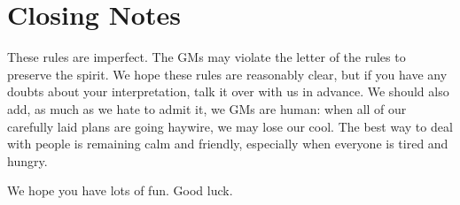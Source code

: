 \documentclass[sheet]{GL2020}
\begin{document}
\section{Closing Notes}

These rules are imperfect.  The GMs may violate the letter of the rules to preserve the spirit.  We hope these rules are reasonably clear, but if you have any doubts about your interpretation, talk it over with us in advance.  We should also add, as much as we hate to admit it, we GMs are human: when all of our carefully laid plans are going haywire, we may lose our cool.  The best way to deal with people is remaining calm and friendly, especially when everyone is tired and hungry.

We hope you have lots of fun.  Good luck.
\end{document}

